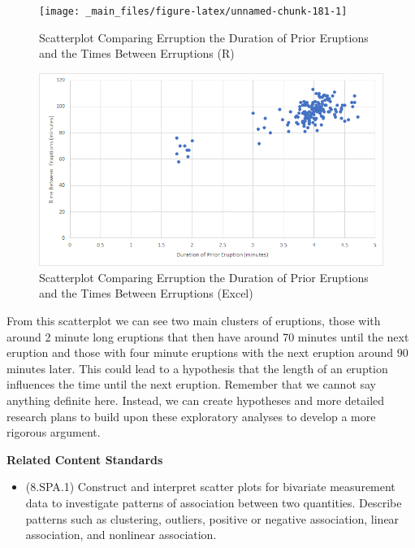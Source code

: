 \documentclass[
]{book}
\providecommand{\tightlist}{%
  \setlength{\itemsep}{0pt}\setlength{\parskip}{0pt}}
\newenvironment{standards}{}{}
\theoremstyle{definition}
\theoremstyle{definition}
\theoremstyle{definition}
\theoremstyle{definition}
\theoremstyle{remark}
\begin{document}
\begin{figure}

{\centering \texttt{[image: \_main\_files/figure-latex/unnamed-chunk-181-1]} 

}

\caption{Scatterplot Comparing Erruption the Duration of Prior Eruptions and the Times Between Erruptions (R)}\label{fig:unnamed-chunk-181}
\end{figure}

\begin{figure}

{\centering \includegraphics[width=0.9\linewidth]{data-examples/Old-Faithful/Eruption-Scatter-Excel} 

}

\caption{Scatterplot Comparing Erruption the Duration of Prior Eruptions and the Times Between Erruptions (Excel)}\label{fig:unnamed-chunk-182}
\end{figure}

From this scatterplot we can see two main clusters of eruptions, those with around 2 minute long eruptions that then have around 70 minutes until the next eruption and those with four minute eruptions with the next eruption around 90 minutes later. This could lead to a hypothesis that the length of an eruption influences the time until the next eruption. Remember that we cannot say anything definite here. Instead, we can create hypotheses and more detailed research plans to build upon these exploratory analyses to develop a more rigorous argument.

\begin{standards}

\begin{center}
\textbf{Related Content Standards}

\end{center}

\begin{itemize}
\tightlist
\item
  (8.SPA.1) Construct and interpret scatter plots for bivariate measurement data to investigate patterns of association between two quantities. Describe patterns such as clustering, outliers, positive or negative association, linear association, and nonlinear association.
\end{itemize}

\end{standards}
\end{document}
